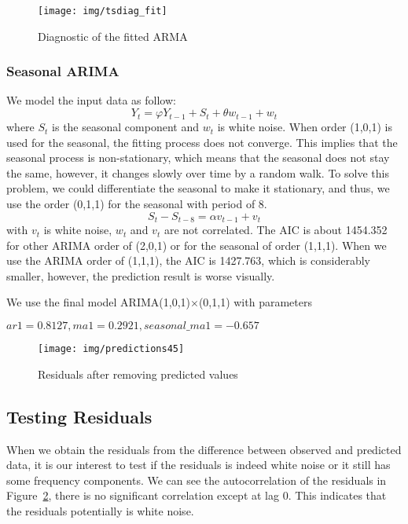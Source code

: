 \documentclass[12pt]{article}
\begin{document}
\begin{figure}[ht!]
\centering
\texttt{[image: img/tsdiag\_fit]}
\caption{Diagnostic of the fitted ARMA}\label{fig:tsdiag_fit}
\end{figure}

\subsubsection{Seasonal ARIMA}
We model the input data as follow:
\begin{equation}
Y_t = \varphi Y_{t-1}+S_t+ \theta w_{t-1}+w_t
\end{equation}
where $S_t$ is the seasonal component and $w_t$ is white noise. When order
(1,0,1) is used for the seasonal, the fitting process does not converge. This implies that the seasonal
process is non-stationary, which means that the seasonal does not
stay the same, however, it changes slowly over time by a random walk. To solve
this problem, we could differentiate the seasonal to make it stationary,
and thus, we use the order (0,1,1) for the seasonal with period of 8.
\begin{equation}
S_t - S_{t-8} = \alpha v_{t-1} + v_t
\end{equation}
with $v_t$ is white noise, $w_t$ and $v_t$ are not correlated. 
The AIC is about 1454.352 for other ARIMA order of (2,0,1) or for the seasonal
of order (1,1,1). When we use the ARIMA order of (1,1,1), the
AIC is 1427.763, which is considerably smaller, however, the prediction
result is worse visually. 

We use the final model ARIMA(1,0,1)$\times$(0,1,1) with parameters  

$ar1=0.8127,ma1=0.2921, seasonal\_ma1=-0.657$

\begin{figure}[ht!]
\centering
\texttt{[image: img/predictions45]}
\caption{Residuals after removing predicted values}\label{fig:predictions45}
\end{figure}

\subsection{Testing Residuals}
When we obtain the residuals from the difference between observed and
predicted data, it is our interest to test if the residuals is indeed white
noise or it still has some frequency components. We can see the
autocorrelation of the residuals in Figure~\ref{fig:predictions45}, there is no
significant correlation except at lag 0. This indicates that the residuals
potentially is white noise.
\end{document}
